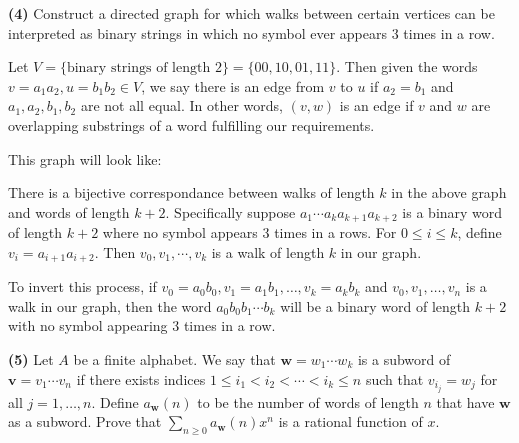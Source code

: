 \documentclass{book}
\newcommand{\exOne}{%
   \color{Purple}%
   \fontsize{13}{15}\selectfont%
}
\newenvironment{myIndent}{%
   \begin{adjustwidth}{2.5em}{0em}%
}{%
   \end{adjustwidth}%
}
\newcommand{\blab}[1]{\textbf{#1}}
\newcommand{\retTwo}{\hfill\bigbreak}
\begin{document}
\blab{(4)} Construct a directed graph for which walks between certain vertices can be\\ interpreted as binary strings in which no symbol ever appears $3$ times in a row.

\begin{myIndent}\exOne
   Let $V = \{\text{binary strings of length } 2\} = \{00, 10, 01, 11\}$. Then given the words\\ $v = a_1a_2, u = b_1b_2 \in V$, we say there is an edge from $v$ to $u$ if $a_2 = b_1$ and\\ $a_1, a_2, b_1, b_2$ are not all equal. In other words, $(v, w)$ is an edge if $v$ and $w$ are\\ overlapping substrings of a word fulfilling our requirements.\retTwo

   This graph will look like: \phantom{aaaaaa}
   \retTwo

   There is a bijective correspondance between walks of length $k$ in the above graph and words of length $k + 2$. Specifically suppose $a_1 \cdots a_{k} a_{k+1} a_{k+2}$ is a binary word of length $k + 2$ where no symbol appears $3$ times in a rows. For $0 \leq i \leq k$, define $v_i = a_{i+1}a_{i+2}$. Then $v_0, v_1, \cdots, v_k$ is a walk of length $k$ in our graph.\retTwo

   To invert this process, if $v_0 = a_0b_0, v_1 = a_1b_1, \ldots, v_k = a_kb_k$ and $v_0, v_1, \ldots, v_n$ is a walk in our graph, then the word $a_0 b_0 b_1 \cdots b_k$ will be a binary word of length $k + 2$ with no symbol appearing $3$ times in a row.\newpage
\end{myIndent}

\blab{(5)} Let $A$ be a finite alphabet. We say that $\bm{w} = w_1\cdots w_k$ is a subword of\\ $\bm{v} = v_1\cdots v_n$ if there exists indices $1 \leq i_1 < i_2 < \cdots < i_k \leq n$ such that $v_{i_j} = w_j$ for all $j = 1, \ldots, n$. Define $a_{\bm{w}}(n)$ to be the number of words of length $n$ that have $\bm{w}$ as a subword. Prove that $\sum\limits_{n \geq 0}a_{\bm{w}}(n)x^n$ is a rational function of $x$.
\end{document}
